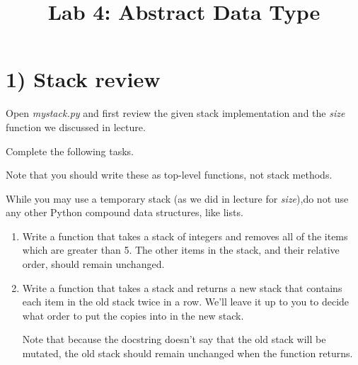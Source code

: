 \documentclass[12pt]{article}
\begin{document}
\title{Lab 4: Abstract Data Type}
\date{}
\maketitle

\section*{1) Stack review}
Open \textit{mystack.py} and first review the given stack implementation and the
\textit{size} function we discussed in lecture.

\bigskip

\noindent Complete the following tasks.

\bigskip

\noindent Note that you should write these as top-level functions, not stack methods.

\bigskip

\noindent While you may use a temporary stack (as we did in lecture for \textit{size}),do not use
any other Python compound data structures, like lists.

\bigskip

\begin{enumerate}[1.]
    \item Write a function that takes a stack of integers and removes all of the items which are greater than 5.
    The other items in the stack, and their relative order, should remain unchanged.

    \item Write a function that takes a stack and returns a new stack that contains each item in the old stack twice in a row.
    We’ll leave it up to you to decide what order to put the copies into in the new stack.

    \bigskip

    Note that because the docstring doesn’t say that the old stack will be mutated,
    the old stack should remain unchanged when the function returns.
\end{enumerate}
\end{document}
